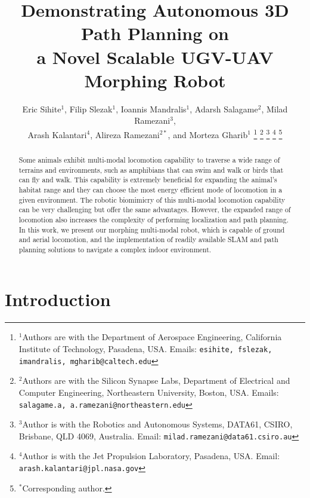 \documentclass[letterpaper, 10 pt, conference]{ieeeconf}  %
\title{\LARGE \bf
Demonstrating Autonomous 3D Path Planning on \\ a Novel Scalable UGV-UAV Morphing Robot
}
\author{Eric Sihite$^{1}$, Filip Slezak$^{1}$, Ioannis Mandralis$^{1}$, Adarsh Salagame$^{2}$, Milad Ramezani$^{3}$, \\ Arash Kalantari$^{4}$, Alireza Ramezani$^{2*}$, and Morteza Gharib$^{1}$%
\thanks{$^{1}$Authors are with the Department of Aerospace Engineering, California Institute of Technology, Pasadena, USA. Emails: 
        {\tt\small esihite, fslezak, imandralis, mgharib@caltech.edu}}%
\thanks{$^{2}$Authors are with the Silicon Synapse Labs, Department of Electrical and Computer Engineering, Northeastern University, Boston, USA. Emails: 
        {\tt\small salagame.a, a.ramezani@northeastern.edu}}%
\thanks{$^{3}$Author is with the Robotics and Autonomous Systems, DATA61, CSIRO, Brisbane, QLD 4069, Australia. Email: 
        {\tt\small milad.ramezani@data61.csiro.au}}%
\thanks{$^{4}$Author is with the Jet Propulsion Laboratory, Pasadena, USA. Email: 
        {\tt\small arash.kalantari@jpl.nasa.gov}}%
\thanks{$^{*}$Corresponding author.}%
}
\begin{document}
\maketitle
\thispagestyle{empty}
\pagestyle{empty}


\begin{abstract}

Some animals exhibit multi-modal locomotion capability to traverse a wide range of terrains and environments, such as amphibians that can swim and walk or birds that can fly and walk. This capability is extremely beneficial for expanding the animal's habitat range and they can choose the most energy efficient mode of locomotion in a given environment. The robotic biomimicry of this multi-modal locomotion capability can be very challenging but offer the same advantages. However, the expanded range of locomotion also increases the complexity of performing localization and path planning. In this work, we present our morphing multi-modal robot, which is capable of ground and aerial locomotion, and the implementation of readily available SLAM and path planning solutions to navigate a complex indoor environment.


\end{abstract}


\section{Introduction}




\end{document}
